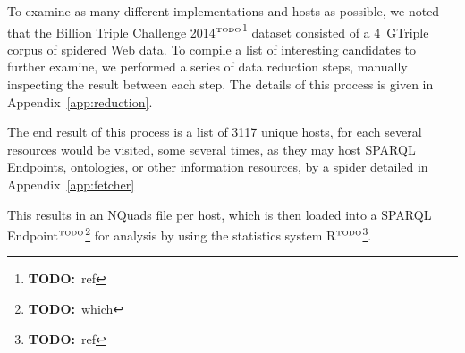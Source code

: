 \documentclass{article}
\newcommand{\todo}[1]{\ensuremath{^{\textrm{\tiny{TODO}\normalsize}}}\footnote{\textbf{TODO:}~#1}}
\begin{document}
To examine as many different implementations and hosts as possible, we
noted that the Billion Triple Challenge 2014\todo{ref} dataset
consisted of a 4~GTriple corpus of spidered Web data. To compile a
list of interesting candidates to further examine, we performed a
series of data reduction steps, manually inspecting the result between
each step. The details of this process is given in
Appendix~\ref{app:reduction}.

The end result of this process is a list of 3117 unique hosts, for
each several resources would be visited, some several times, as they
may host SPARQL Endpoints, ontologies, or other information resources,
by a spider detailed in Appendix~\ref{app:fetcher}

This results in an NQuads file per host, which is then loaded into a
SPARQL Endpoint\todo{which} for analysis by using the statistics
system R\todo{ref}.
\end{document}
